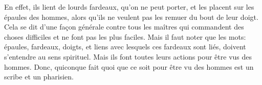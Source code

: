 En effet, ils lient de lourds fardeaux, qu’on ne peut porter,
	et les placent sur les épaules des hommes,
	alors qu’ils ne veulent pas les remuer du bout de leur doigt.
Cela se dit d’une façon générale
	contre tous les maîtres qui commandent des choses difficiles
	et ne font pas les plus faciles.
Mais il faut noter que les mots: épaules, fardeaux, doigts,
		et liens avec lesquels ces fardeaux sont liés,
	doivent s’entendre au sens spirituel.
Mais ils font toutes leurs actions pour être vus des hommes.
	Donc, quiconque fait quoi que ce soit pour être vu des hommes
	est un scribe et un pharisien.
